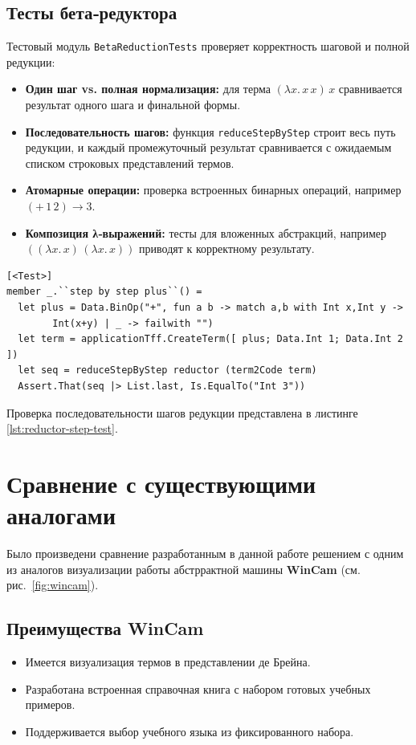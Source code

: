 \begin{itemize}
\subsection{Тесты бета‑редуктора}

Тестовый модуль \texttt{BetaReductionTests} проверяет корректность шаговой и полной редукции:

\begin{itemize}
  \item \textbf{Один шаг vs. полная нормализация:} для терма \((\lambda x.\,x\,x)\,x\) сравнивается результат одного шага и финальной формы.  
  \item \textbf{Последовательность шагов:} функция \texttt{reduceStepByStep} строит весь путь редукции, и каждый промежуточный результат сравнивается с ожидаемым списком строковых представлений термов.  
  \item \textbf{Атомарные операции:} проверка встроенных бинарных операций, например \((+\,1\,2)\to 3\).  
  \item \textbf{Композиция λ‑выражений:} тесты для вложенных абстракций, например \(((\lambda x.\,x)\,(\lambda x.\,x))\) приводят к корректному результату.  
\end{itemize}

\begin{lstlisting}[float=tb,frame=lines,label=lst:reductor-step-test,caption={Проверка последовательности шагов редукции}]
[<Test>]
member _.``step by step plus``() =
  let plus = Data.BinOp("+", fun a b -> match a,b with Int x,Int y -> 
        Int(x+y) | _ -> failwith "")
  let term = applicationTff.CreateTerm([ plus; Data.Int 1; Data.Int 2 ])
  let seq = reduceStepByStep reductor (term2Code term)
  Assert.That(seq |> List.last, Is.EqualTo("Int 3"))
\end{lstlisting}

Проверка последовательности шагов редукции представлена в листинге \ref{lst:reductor-step-test}.

\section{Сравнение с существующими аналогами}
\label{sec:comparison-analogs}

Было произведени сравнение разработанным в данной работе решением с одним из аналогов визуализации работы абстррактной машины \textbf{WinCam} (см. рис.~\ref{fig:wincam}).


\subsection*{Преимущества WinCam}
\begin{itemize}
  \item Имеется визуализация термов в представлении де Брейна.
  \item Разработана встроенная справочная книга с набором готовых учебных примеров.
  \item Поддерживается выбор учебного языка из фиксированного набора.
\end{itemize}


\end{itemize}
